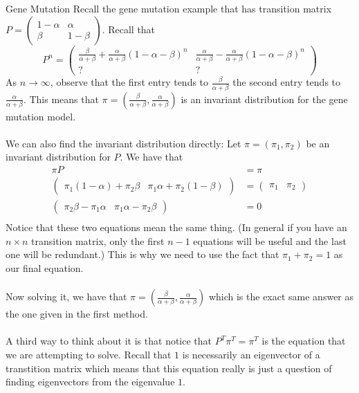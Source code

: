 \documentclass[a4paper]{article}
\begin{document}
\begin{eg}{Gene Mutation}{} Recall the gene mutation example that has transition matrix $P=\begin{pmatrix}
1-\alpha & \alpha\\
\beta & 1-\beta
\end{pmatrix}$. Recall that $$P^n=\begin{pmatrix}
\frac{\beta}{\alpha+\beta}+\frac{\alpha}{\alpha+\beta}(1-\alpha-\beta)^n & \frac{\alpha}{\alpha+\beta}-\frac{\alpha}{\alpha+\beta}(1-\alpha-\beta)^n\\
? & ?
\end{pmatrix}$$
As $n\to\infty$, observe that the first entry tends to $\frac{\beta}{\alpha+\beta}$ the second entry tends to $\frac{\alpha}{\alpha+\beta}$. This means that $\pi=\left(\frac{\beta}{\alpha+\beta},\frac{\alpha}{\alpha+\beta}\right)$ is an invariant distribution for the gene mutation model. \\~\\
We can also find the invariant distribution directly: Let $\pi=(\pi_1,\pi_2)$ be an invariant distribution for $P$. We have that 
\begin{align*}
\pi P&=\pi\\
\begin{pmatrix}
\pi_1(1-\alpha)+\pi_2\beta & \pi_1\alpha+\pi_2(1-\beta)
\end{pmatrix}&=\begin{pmatrix}
\pi_1 & \pi_2
\end{pmatrix}\\
\begin{pmatrix}
\pi_2\beta-\pi_1\alpha & \pi_1\alpha-\pi_2\beta
\end{pmatrix}&=0\\
\end{align*} Notice that these two equations mean the same thing. (In general if you have an $n\times n$ transition matrix, only the first $n-1$ equations will be useful and the last one will be redundant.) This is why we need to use the fact that $\pi_1+\pi_2=1$ as our final equation. \\~\\
Now solving it, we have that $\pi=\left(\frac{\beta}{\alpha+\beta},\frac{\alpha}{\alpha+\beta}\right)$ which is the exact same answer as the one given in the first method. \\~\\
A third way to think about it is that notice that $P^T\pi^T=\pi^T$ is the equation that we are attempting to solve. Recall that $1$ is necessarily an eigenvector of a transtition matrix which means that this equation really is just a question of finding eigenvectors from the eigenvalue $1$. 
\end{eg}
\end{document}
